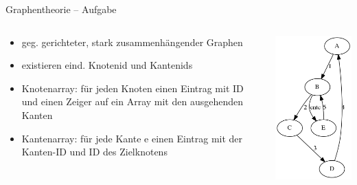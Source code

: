 \documentclass[18pt]{beamer}
\begin{document}
\begin{frame}{Graphentheorie -- Aufgabe}
\begin{columns}[onlytextwidth]
 \begin{column}{0.6\textwidth}
 \begin{itemize}
  \item geg. gerichteter, stark zusammenhängender Graphen
  \item existieren eind. Knotenid und Kantenids
  \item Knotenarray: für jeden Knoten einen Eintrag mit ID und einen Zeiger auf ein Array mit den ausgehenden Kanten
  \item Kantenarray: für jede Kante e einen Eintrag mit der Kanten-ID und ID des Zielknotens
 \end{itemize}
\end{column}
\begin{column}{0.4\textwidth}
 \includegraphics[scale=0.5]{beispielgraph.png}
\end{column}
\end{columns}
 
\end{frame}
\end{document}
